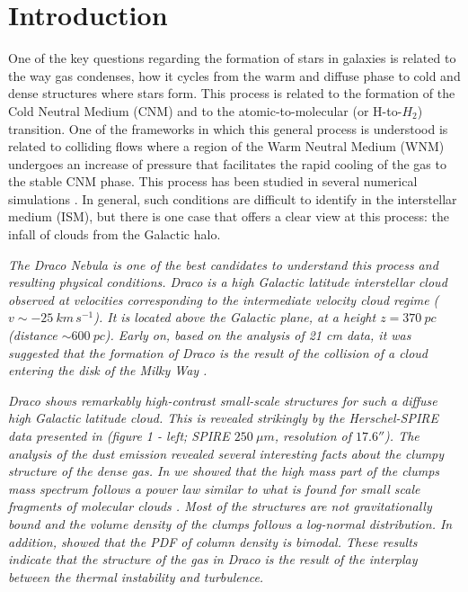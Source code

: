 \documentclass[traditabstract]{aa}
\begin{document}


\section{Introduction}

   One of the key questions regarding the formation of stars in galaxies is related to the way gas condenses, how it cycles from the warm and diffuse phase to cold and dense structures where stars form. This process is related to the formation of the Cold Neutral Medium (CNM) and to the atomic-to-molecular (or H-to-$H_2$) transition. One of the frameworks in which this general process is understood is related to colliding flows where a region of the Warm Neutral Medium (WNM) undergoes an increase of pressure that facilitates the rapid cooling of the gas to the stable CNM phase. This process has been studied in several numerical simulations \citep{Hennebelle_1999,Audit_2005,Vazquez_2006,Hennebelle_2007,Inoue_2009,Saury_2014}. In general, such conditions are difficult to identify in the interstellar medium (ISM), but there is one case that offers a clear view at this process: the infall of clouds from the Galactic halo.

\textit{   The Draco Nebula is one of the best candidates to understand this process and resulting physical conditions. Draco is a high Galactic latitude interstellar cloud observed at velocities corresponding to the intermediate velocity cloud regime ($v\sim -25\: km\, s^{-1}$). It is located above the Galactic plane, at a height $z=370\: pc$ (distance $\sim 600\: pc$).  Early on, based on the analysis of 21 cm data, it was suggested that the formation of Draco is the result of the collision of a cloud entering the disk of the Milky Way \citep{Goerigk_1983}.}

\textit{   Draco shows remarkably high-contrast small-scale structures for such a diffuse high Galactic latitude cloud. This is revealed strikingly by the \emph{Herschel}-SPIRE data presented in \cite{MAMD_2017b} (figure 1 - left; SPIRE $250\: \mu m$, resolution of $17.6''$).
The analysis of the dust emission revealed several interesting facts about the clumpy structure of the dense gas. In \cite{MAMD_2017b} we showed that the high mass part of the clumps mass spectrum follows a power law similar to what is found for small scale fragments of molecular clouds \cite{Peretto_2010}. Most of the structures are not gravitationally bound and the volume density of the clumps follows a log-normal distribution. In addition, \cite{Schneider_2017} showed that the PDF of column density is bimodal. These results indicate that the structure of the gas in Draco is the result of the interplay between the thermal instability and turbulence.}
\end{document}
